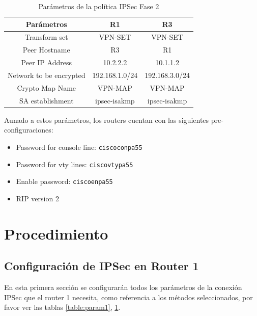\documentclass{article}
\begin{document}
        \begin{table}[!h]
            \centering
            \begin{tabular}{ ||c|c|c|| }
                \hline
                Parámetros & R1 & R3 \\ \hline
                Transform set & VPN-SET & VPN-SET \\ \hline
                Peer Hostname & R3 & R1 \\ \hline
                Peer IP Address & 10.2.2.2 & 10.1.1.2 \\ \hline
                Network to be encrypted & 192.168.1.0/24 & 192.168.3.0/24 \\ \hline
                Crypto Map Name & VPN-MAP & VPN-MAP \\ \hline
                SA establishment & ipsec-isakmp & ipsec-isakmp \\ \hline        
            \end{tabular}
            \caption{Parámetros de la política IPSec Fase 2}
            \label{table:param2}
        \end{table}

        Aunado a estos parámetros, los routers cuentan con las siguientes pre-configuraciones:
        \begin{itemize}
            \item Password for console line: \texttt{ciscoconpa55}
            \item Password for vty lines: \texttt{ciscovtypa55}
            \item Enable password: \texttt{ciscoenpa55}
            \item RIP version 2
        \end{itemize}

    \section{Procedimiento} \label{sec:process}

        \subsection{Configuración de IPSec en Router 1} \label{sec:ipsec-r1}

            En esta primera sección se configurarán todos los parámetros de la conexión IPSec que el router 1 necesita, como referencia a los métodos seleccionados, por favor ver las tablas \ref{table:param1}, \ref{table:param2}.
\end{document}
